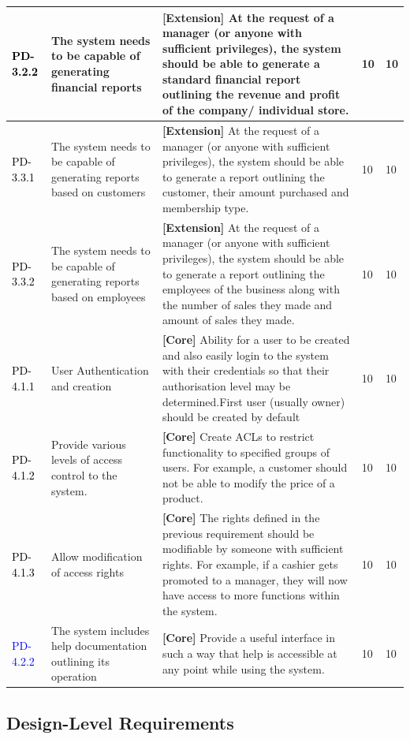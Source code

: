 \documentclass[a4paper]{article}
\begin{document}
\begin{longtable}{|l|p{5cm}|p{7cm}|p{0.5cm}|p{0.5cm}|}
\textcolor{black}{PD-3.2.2} & The system needs to be capable of generating financial reports & \textbf{[Extension] }At the request of a manager (or anyone with sufficient privileges), the system should be able to generate a standard financial report outlining the revenue and profit of the company/ individual store.& 10 & 10\\
\hline
\textcolor{black}{PD-3.3.1} & The system needs to be capable of generating reports based on customers & \textbf{[Extension] }At the request of a manager (or anyone with sufficient privileges), the system should be able to generate a report outlining the customer, their amount purchased and membership type.& 10 & 10\\
\textcolor{black}{PD-3.3.2} & The system needs to be capable of generating reports based on employees & \textbf{[Extension] }At the request of a manager (or anyone with sufficient privileges), the system should be able to generate a report outlining the employees of the business along with the number of sales they made and amount of sales they made.& 10 & 10\\
\hline
\textcolor{black}{PD-4.1.1} & User Authentication and creation& \textbf{[Core] }Ability for a user to be created and also easily login to the system with their credentials so that their authorisation level may be determined.First user (usually owner) should be created by default& 10 & 10\\
\textcolor{black}{PD-4.1.2} & Provide various levels of access control to the system. & \textbf{[Core] }Create ACLs to restrict functionality to specified groups of users. For example, a customer should not be able to modify the price of a product.& 10 & 10\\
\textcolor{black} {PD-4.1.3} & Allow modification of access rights & \textbf{[Core] }The rights defined in the previous requirement should be modifiable by someone with sufficient rights. For example, if a cashier gets promoted to a manager, they will now have access to more functions within the system.& 10 & 10\\
\textcolor{blue} {PD-4.2.2} & The system includes help documentation outlining its operation & \textbf{[Core] }Provide a useful interface in such a way that help is accessible at any point while using the system.& 10 & 10\\
\hline
 \hline
\end{longtable}
\pagebreak

\subsection{Design-Level Requirements}
\end{document}
